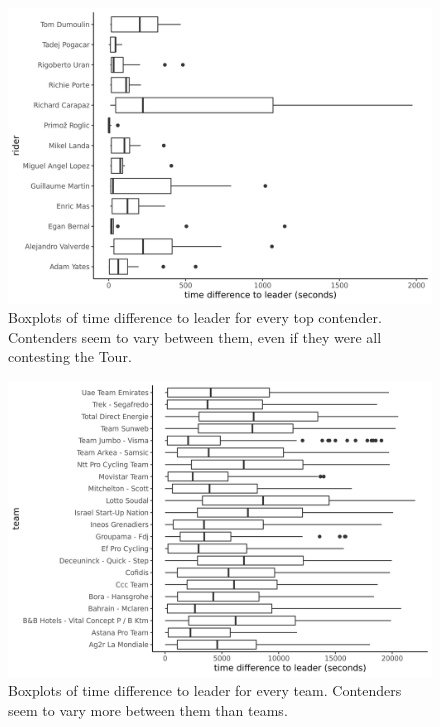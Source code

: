 \documentclass[aos,preprint]{imsart}
\begin{document}
\begin{figure}[h]
  \centering
  \includegraphics[scale=0.65]{fig/timediff_contender.png}
  \caption{Boxplots of time difference to leader for every top contender. Contenders seem to vary between them, even if they were all contesting the Tour.}
  \label{fig:timediff_contender}
\end{figure}


\begin{figure}[h]
  \centering
  \includegraphics[scale=0.65]{fig/timediff_team.png}
  \caption{Boxplots of time difference to leader for every team. Contenders seem to vary more between them than teams.}
  \label{fig:timediff_team}
\end{figure}
\end{document}
